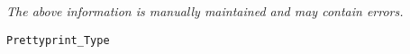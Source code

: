 \label{pkg:prettyprint\_type}

{\tiny \it The above information is manually maintained and may contain errors.}
\begin{verbatim}
Prettyprint_Type
\end{verbatim}
